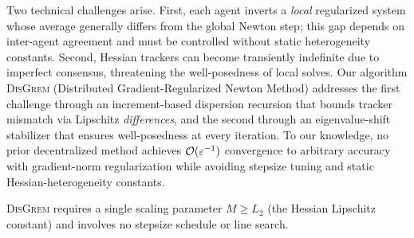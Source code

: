 \documentclass[review,onefignum,onetabnum]{siamart171218}
\begin{document}
	Two technical challenges arise.
	First, each agent inverts a \emph{local} regularized system whose
	average generally differs from the global Newton step; this gap
	depends on inter-agent agreement and must be controlled without
	static heterogeneity constants.
	Second, Hessian trackers can become transiently indefinite due to
	imperfect consensus, threatening the well-posedness of local solves.
	Our algorithm \textsc{DisGrem} (Distributed Gradient-Regularized
	Newton Method) addresses the first challenge through an increment-based
	dispersion recursion that bounds tracker mismatch via Lipschitz
	\emph{differences}, and the second through an eigenvalue-shift
	stabilizer that ensures well-posedness at every iteration.
	To our knowledge, no prior decentralized method achieves
	$\mathcal{O}(\varepsilon^{-1})$ convergence to arbitrary accuracy
	with gradient-norm regularization while avoiding stepsize tuning and
	static Hessian-heterogeneity constants.
	
\textsc{DisGrem} requires a single scaling parameter
$M\ge L_2$ (the Hessian Lipschitz constant) and involves no stepsize schedule or line search.
\end{document}
